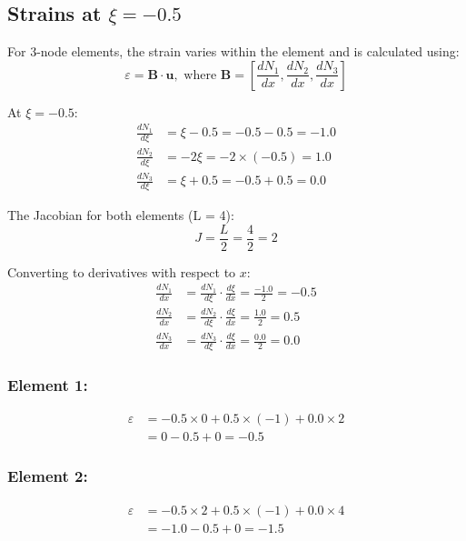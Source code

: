 \documentclass[12pt,a4paper]{article}
\begin{document}
\subsection{Strains at $\xi = -0.5$}
For 3-node elements, the strain varies within the element and is calculated using:
\begin{equation}
\varepsilon = \mathbf{B} \cdot \mathbf{u}, \text{ where } \mathbf{B} = \left[\frac{dN_1}{dx}, \frac{dN_2}{dx}, \frac{dN_3}{dx}\right]
\end{equation}

At $\xi = -0.5$:
\begin{align}
\frac{dN_1}{d\xi} &= \xi - 0.5 = -0.5 - 0.5 = -1.0 \\
\frac{dN_2}{d\xi} &= -2\xi = -2 \times (-0.5) = 1.0 \\
\frac{dN_3}{d\xi} &= \xi + 0.5 = -0.5 + 0.5 = 0.0
\end{align}

The Jacobian for both elements (L = 4):
\begin{equation}
J = \frac{L}{2} = \frac{4}{2} = 2
\end{equation}

Converting to derivatives with respect to $x$:
\begin{align}
\frac{dN_1}{dx} &= \frac{dN_1}{d\xi} \cdot \frac{d\xi}{dx} = \frac{-1.0}{2} = -0.5 \\
\frac{dN_2}{dx} &= \frac{dN_2}{d\xi} \cdot \frac{d\xi}{dx} = \frac{1.0}{2} = 0.5 \\
\frac{dN_3}{dx} &= \frac{dN_3}{d\xi} \cdot \frac{d\xi}{dx} = \frac{0.0}{2} = 0.0
\end{align}

\subsubsection*{Element 1:}
\begin{align}
\varepsilon &= -0.5 \times 0 + 0.5 \times (-1) + 0.0 \times 2 \\
&= 0 - 0.5 + 0 = -0.5
\end{align}

\subsubsection*{Element 2:}
\begin{align}
\varepsilon &= -0.5 \times 2 + 0.5 \times (-1) + 0.0 \times 4 \\
&= -1.0 - 0.5 + 0 = -1.5
\end{align}
\end{document}
